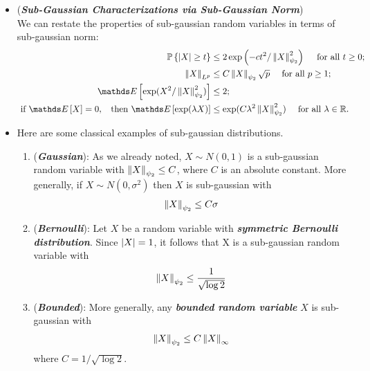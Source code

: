 \documentclass[11pt]{article}
\begin{document}
\begin{itemize}
\item \begin{remark} (\emph{\textbf{Sub-Gaussian  Characterizations via Sub-Gaussian Norm}})\\
We can restate the properties of sub-gaussian random variables in terms of sub-gaussian norm:
\begin{align*}
\bP\set{\abs{X} \ge t} &\le 2 \exp\paren{-c t^2/\norm{X}{\psi_2}^2}\quad\text{ for all }t \ge 0; \\
\norm{X}{L^p} &\le C \norm{X}{\psi_2} \sqrt{p}\quad \text{ for all }p \ge 1; \\
\E{}{\exp(X^2 / \norm{X}{\psi_2}^2)} &\le 2; \\
\text{ if }\E{}{X} = 0, \;\;\text{ then } \E{}{\exp(\lambda X)} &\le  \exp(C \lambda^2 \norm{X}{\psi_2}^2)\quad\text{ for all }\lambda \in \bR.
\end{align*}
\end{remark}

\item \begin{example}
Here are some classical examples of sub-gaussian distributions.
\begin{enumerate}
\item  (\textbf{\emph{Gaussian}}): As we already noted, $X \sim N(0, 1)$ is a sub-gaussian random
variable with $\left\|X\right\|_{\psi_2} \le C$, where $C$ is an absolute constant. More generally, if $X \sim N(0, \sigma^2)$ then $X$ is sub-gaussian with
\begin{align}
\left\|X\right\|_{\psi_2} \le C\sigma \label{eqn: gaussian_sub_guassian_norm}
\end{align}
\item  (\emph{\textbf{Bernoulli}}): Let $X$ be a random variable with \emph{\textbf{symmetric Bernoulli distribution}}. Since $\left\lvert X \right\rvert = 1$, it follows that X is a
sub-gaussian random variable with
\begin{align}
\left\|X\right\|_{\psi_2} \le \frac{1}{\sqrt{\log 2}} \label{eqn: sym_bernoulli_sub_guassian_norm}
\end{align}
\item (\emph{\textbf{Bounded}}): More generally, any \emph{\textbf{bounded random variable}} $X$ is sub-gaussian with
\begin{align}
\left\|X\right\|_{\psi_2} \le C\left\|X\right\|_{\infty} \label{eqn: bounded_sub_guassian_norm}
\end{align}
where $C = 1/\sqrt{\log 2}$.
\end{enumerate}
\end{example}
\end{itemize}
\end{document}
